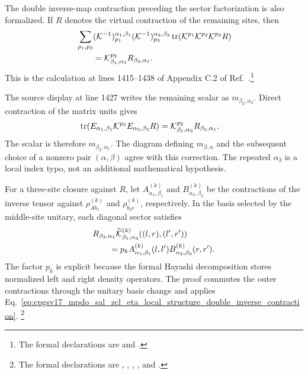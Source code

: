 \documentclass{article}
\begin{document}
The double inverse-map contraction preceding the sector factorization is also
formalized. If $R$ denotes the virtual contraction of the remaining sites,
then
\begin{align}
    &\sum_{p_1,p_3}
        (\mathcal K^{-1})^{\alpha_1,\beta_1}_{p_1}
        (\mathcal K^{-1})^{\alpha_3,\beta_3}_{p_3}
        \operatorname{tr}\!\left(\mathcal K^{p_1}\mathcal K^{p_2}\mathcal K^{p_3}R\right)
    \notag\\
    &\qquad =
        \mathcal K^{p_2}_{\beta_1,\alpha_3}
        R_{\beta_3,\alpha_1}.
    \label{eq:cpgsv17_mpdo_sal_zcl_eta_local_structure_double_inverse_contraction}
\end{align}
This is the calculation at lines 1415--1438 of Appendix C.2 of
Ref.~\cite{Cirac2016MPDO_arXiv}.\footnote{The formal declarations are
 and
.}

The source display at line 1427 writes the remaining scalar as
$m_{\beta_3,\alpha_3}$. Direct contraction of the matrix units gives
\begin{align}
    \operatorname{tr}\!\left(E_{\alpha_1,\beta_1}
        \mathcal K^{p_2}
        E_{\alpha_3,\beta_3}R\right)
        &=
        \mathcal K^{p_2}_{\beta_1,\alpha_3}
        R_{\beta_3,\alpha_1}.
    \label{eq:cpgsv17_mpdo_sal_zcl_eta_local_structure_matrix_unit_contraction}
\end{align}
The scalar is therefore $m_{\beta_3,\alpha_1}$. The diagram defining
$m_{\beta,\alpha}$ and the subsequent choice of a nonzero pair
$(\alpha,\beta)$ agree with this correction. The repeated $\alpha_3$ is a
local index typo, not an additional mathematical hypothesis.

For a three-site closure against $R$, let
$A^{(k)}_{\alpha_1,\beta_1}$ and
$B^{(k)}_{\alpha_3,\beta_3}$ be the contractions of the inverse tensor
against $\rho_{A b_1}^{(k)}$ and $\rho_{b_2 c}^{(k)}$, respectively. In the
basis selected by the middle-site unitary, each diagonal sector satisfies
\begin{align}
    &R_{\beta_3,\alpha_1}
        \widetilde{\mathcal K}^{(k)}_{\beta_1,\alpha_3}
        ((l,r),(l',r'))
    \notag\\
    &\qquad =
        p_k
        A^{(k)}_{\alpha_1,\beta_1}(l,l')
        B^{(k)}_{\alpha_3,\beta_3}(r,r').
    \label{eq:cpgsv17_mpdo_sal_zcl_eta_local_structure_hayashi_sector_comparison}
\end{align}
The factor $p_k$ is explicit because the formal Hayashi decomposition stores
normalized left and right density operators. The proof commutes the outer
contractions through the unitary basis change and applies
Eq.~\ref{eq:cpgsv17_mpdo_sal_zcl_eta_local_structure_double_inverse_contraction}.
\footnote{The formal declarations are
,
,
,
, and
.}
\end{document}
